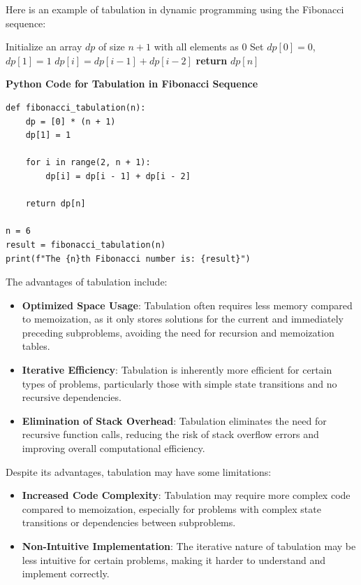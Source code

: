 \documentclass[12pt]{book} %
\begin{document}
Here is an example of tabulation in dynamic programming using the Fibonacci sequence:
\FloatBarrier
\begin{algorithm}
\caption{Tabulation for Fibonacci Sequence}
\begin{algorithmic}
\State Initialize an array $dp$ of size $n+1$ with all elements as 0
\State Set $dp[0] = 0$, $dp[1] = 1$
    \State $dp[i] = dp[i-1] + dp[i-2]$
\EndFor
\State \textbf{return} $dp[n]$
\end{algorithmic}
\end{algorithm}
\FloatBarrier
\textbf{Python Code for Tabulation in Fibonacci Sequence}
\FloatBarrier
\begin{lstlisting}
def fibonacci_tabulation(n):
    dp = [0] * (n + 1)
    dp[1] = 1
    
    for i in range(2, n + 1):
        dp[i] = dp[i - 1] + dp[i - 2]
    
    return dp[n]

n = 6
result = fibonacci_tabulation(n)
print(f"The {n}th Fibonacci number is: {result}")
\end{lstlisting}
\FloatBarrier
The advantages of tabulation include:

\begin{itemize}
    \item \textbf{Optimized Space Usage}: Tabulation often requires less memory compared to memoization, as it only stores solutions for the current and immediately preceding subproblems, avoiding the need for recursion and memoization tables.
    \item \textbf{Iterative Efficiency}: Tabulation is inherently more efficient for certain types of problems, particularly those with simple state transitions and no recursive dependencies.
    \item \textbf{Elimination of Stack Overhead}: Tabulation eliminates the need for recursive function calls, reducing the risk of stack overflow errors and improving overall computational efficiency.
\end{itemize}

Despite its advantages, tabulation may have some limitations:

\begin{itemize}
    \item \textbf{Increased Code Complexity}: Tabulation may require more complex code compared to memoization, especially for problems with complex state transitions or dependencies between subproblems.
    \item \textbf{Non-Intuitive Implementation}: The iterative nature of tabulation may be less intuitive for certain problems, making it harder to understand and implement correctly.
\end{itemize}
\end{document}
